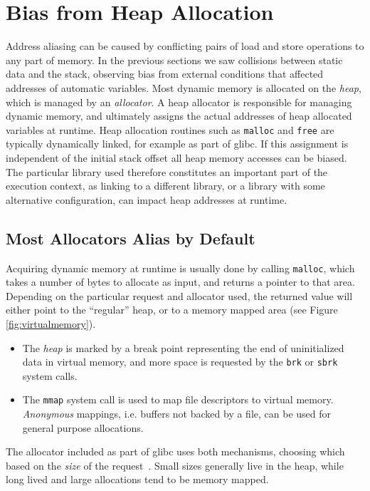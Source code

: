 \documentclass{acm_proc_article-sp}
\begin{document}
\section{Bias from Heap Allocation}
\label{sec:heap}
Address aliasing can be caused by conflicting pairs of load and store operations to any part of memory.
In the previous sections we saw collisions between static data and the stack, observing bias from external conditions that affected addresses of automatic variables.
Most dynamic memory is allocated on the \emph{heap}, which is managed by an \emph{allocator}.
A heap allocator is responsible for managing dynamic memory, and ultimately assigns the actual addresses of heap allocated variables at runtime.
Heap allocation routines such as \texttt{malloc} and \texttt{free} are typically dynamically linked, for example as part of glibc.
If this assignment is independent of the initial stack offset all heap memory accesses can be biased.
The particular library used therefore constitutes an important part of the execution context, as linking to a different library, or a library with some alternative configuration, can impact heap addresses at runtime.

\subsection{Most Allocators Alias by Default}
Acquiring dynamic memory at runtime is usually done by calling \texttt{malloc}, which takes a number of bytes to allocate as input, and returns a pointer to that area.
Depending on the particular request and allocator used, the returned value will either point to the ``regular'' heap, or to a memory mapped area (see Figure \ref{fig:virtualmemory}).
\begin{itemize}
  \item The \emph{heap} is marked by a break point representing the end of uninitialized data in virtual memory, and more space is requested by the \texttt{brk} or \texttt{sbrk} system calls.
  \item The \texttt{mmap} system call is used to map file descriptors to virtual memory. \emph{Anonymous} mappings, i.e. buffers not backed by a file, can be used for general purpose allocations.
\end{itemize}
The allocator included as part of glibc uses both mechanisms, choosing which based on the \emph{size} of the request~\cite{GlibcManual}.
Small sizes generally live in the heap, while long lived and large allocations tend to be memory mapped.
\end{document}
